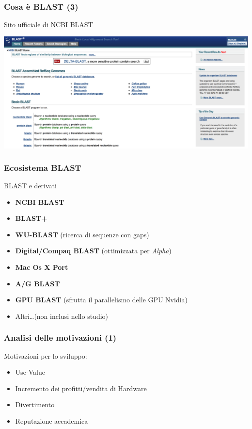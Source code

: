 \begin{frame}\frametitle{Cosa è BLAST (3)}

\begin{center}
\Large{Sito ufficiale di NCBI BLAST}
\end{center}

\begin{center}
    \includegraphics[scale=.12]{img/ncbi_blast}
\end{center}

\end{frame}

\begin{frame}\frametitle{Ecosistema BLAST}

\Large{BLAST e derivati}

\begin{itemize}[<+->]
\itemsep1pt\parskip0pt
\item
  \alert{\textbf{NCBI BLAST}}
\item
  \alert{\textbf{BLAST+}}
\item
  \textbf{WU-BLAST} (ricerca di sequenze con gaps)
\item
  \textbf{Digital/Compaq BLAST} (ottimizzata per \emph{Alpha})
\item
  \textbf{Mac Os X Port}
\item
  \textbf{A/G BLAST}
\item
  \textbf{GPU BLAST} (sfrutta il parallelismo delle GPU Nvidia)
\item
  Altri\dots (non inclusi nello studio)
\end{itemize}

\end{frame}

\begin{frame}\frametitle{Analisi delle motivazioni (1)}

\Large{Motivazioni per lo \alert{sviluppo}:}

\begin{itemize}[<+->]
\itemsep1pt\parskip0pt
\item
  Use-Value
\item
  Incremento dei profitti/vendita di Hardware
\item
  Divertimento
\item
  Reputazione accademica
\end{itemize}

\end{frame}

